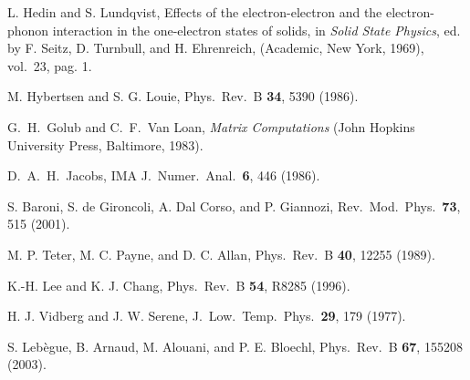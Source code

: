 \documentclass[twocolumn,prb,showpacs,superscriptaddress]{revtex4}
\begin{document}
\begin{thebibliography}{99}

L. Hedin and S. Lundqvist,
Effects of the electron-electron and the electron-phonon interaction in
the one-electron states of solids,
in {\it Solid State Physics}, ed. by F. Seitz, D. Turnbull, and
H. Ehrenreich, (Academic, New York, 1969), vol.\ 23, pag. 1.

M. Hybertsen and S. G. Louie, 
Phys.\ Rev.\ B {\bf 34}, 5390 (1986).

G.\ H.\ Golub and C.\ F.\ Van Loan, {\it Matrix Computations} (John Hopkins University Press, Baltimore, 1983).

D.\ A.\ H.\ Jacobs,
IMA J.\ Numer.\ Anal.\ {\bf 6}, 446 (1986).

S. Baroni, S. de Gironcoli, A. Dal Corso, and P. Giannozi, 
Rev.\ Mod.\ Phys.\ {\bf 73}, 515 (2001).

M. P. Teter, M. C. Payne, and D. C. Allan,
Phys.\ Rev.\ B {\bf 40}, 12255 (1989).

K.-H. Lee and K. J. Chang,
Phys.\ Rev.\ B {\bf 54}, R8285 (1996).

H. J. Vidberg and J. W. Serene,
J.\ Low.\ Temp.\ Phys.\ {\bf 29}, 179 (1977).

S. Leb\`egue, B. Arnaud, M. Alouani, and P. E. Bloechl,
Phys.\ Rev.\ B {\bf 67}, 155208 (2003).


\end{thebibliography}
\end{document}
